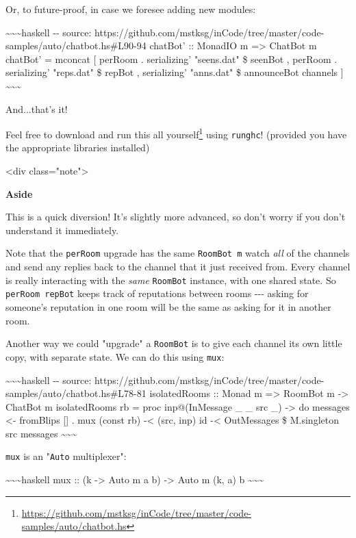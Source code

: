 \documentclass[]{article}
\renewcommand{\href}[2]{#2\footnote{\url{#1}}}
\begin{document}
Or, to future-proof, in case we foresee adding new modules:

\textasciitilde{}\textasciitilde{}\textasciitilde{}haskell -\/- source:
https://github.com/mstksg/inCode/tree/master/code-samples/auto/chatbot.hs\#L90-94
chatBot' :: MonadIO m =\textgreater{} ChatBot m chatBot' = mconcat {[} perRoom .
serializing' "seens.dat" \$ seenBot , perRoom . serializing' "reps.dat" \$
repBot , serializing' "anns.dat" \$ announceBot channels {]}
\textasciitilde{}\textasciitilde{}\textasciitilde{}

And...that's it!

Feel free to
\href{https://github.com/mstksg/inCode/tree/master/code-samples/auto/chatbot.hs}{download
and run this all yourself} using \texttt{runghc}! (provided you have the
appropriate libraries installed)

\textless{}div class="note"\textgreater{}

\textbf{Aside}

This is a quick diversion! It's slightly more advanced, so don't worry if you
don't understand it immediately.

Note that the \texttt{perRoom} upgrade has the same \texttt{RoomBot\ m} watch
\emph{all} of the channels and send any replies back to the channel that it just
received from. Every channel is really interacting with the \emph{same}
\texttt{RoomBot} instance, with one shared state. So \texttt{perRoom\ repBot}
keeps track of reputations between rooms -\/-\/- asking for someone's reputation
in one room will be the same as asking for it in another room.

Another way we could "upgrade" a \texttt{RoomBot} is to give each channel its
own little copy, with separate state. We can do this using \texttt{mux}:

\textasciitilde{}\textasciitilde{}\textasciitilde{}haskell -\/- source:
https://github.com/mstksg/inCode/tree/master/code-samples/auto/chatbot.hs\#L78-81
isolatedRooms :: Monad m =\textgreater{} RoomBot m -\textgreater{} ChatBot m
isolatedRooms rb = proc inp@(InMessage \_ \_ src \_) -\textgreater{} do messages
\textless{}- fromBlips {[}{]} . mux (const rb) -\textless{} (src, inp) id
-\textless{} OutMessages \$ M.singleton src messages
\textasciitilde{}\textasciitilde{}\textasciitilde{}

\texttt{mux} is an "\texttt{Auto} multiplexer":

\textasciitilde{}\textasciitilde{}\textasciitilde{}haskell mux :: (k
-\textgreater{} Auto m a b) -\textgreater{} Auto m (k, a) b
\textasciitilde{}\textasciitilde{}\textasciitilde{}
\end{document}

